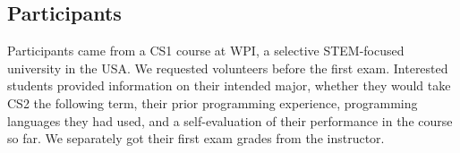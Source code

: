 


\subsection{Participants}

Participants came from a CS1 course at WPI, a selective
STEM-focused university in the USA.
We requested volunteers before the first
exam. Interested students provided information on
their intended major, whether they would take CS2 the following term,
their prior programming experience, programming languages they had used, and a self-evaluation of their performance in the course so far. We separately got their first exam grades from the instructor.


